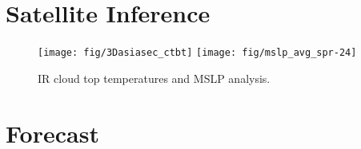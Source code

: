 \documentclass[12pt,a4paper]{article} %
\begin{document}



\section{Satellite Inference}
\begin{figure}[H]
\centering
\texttt{[image: fig/3Dasiasec\_ctbt]}
\texttt{[image: fig/mslp\_avg\_spr-24]}
\caption{IR cloud top temperatures and MSLP analysis.}
\end{figure}






\section{Forecast}



\end{document}
